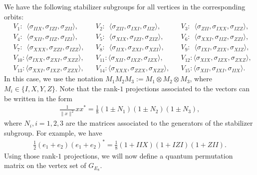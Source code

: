 We have the following stabilizer subgroups for all vertices in the corresponding orbits:
\begin{align} \label{Stabs}
    &V_1:\,\,\, \langle \sigma_{IIX}, \sigma_{IZI}, \sigma_{ZII}\rangle, &&V_2:\,\,\,\langle \sigma_{ZII}, \sigma_{IXI}, \sigma_{IIZ}\rangle, &&V_3:\,\,\,\langle \sigma_{ZII}, \sigma_{IXX}, \sigma_{IZZ}\rangle,\\
    &V_4:\,\,\,\langle \sigma_{XII}, \sigma_{IIZ}, \sigma_{IZI}\rangle, &&V_5:\,\,\,\langle \sigma_{XIX}, \sigma_{IZI}, \sigma_{ZIZ}\rangle, &&V_6:\,\,\,\langle \sigma_{XXI}, \sigma_{IIZ}, \sigma_{ZZI}\rangle,\nonumber\\
    &V_7:\,\,\,\langle \sigma_{XXX}, \sigma_{ZZI}, \sigma_{IZZ}\rangle, &&V_8:\,\,\,\langle \sigma_{IIX}, \sigma_{ZXI}, \sigma_{XZI}\rangle, &&V_9:\,\,\,\langle \sigma_{IXI}, \sigma_{ZIX}, \sigma_{XIZ}\rangle,\nonumber\\
    &V_{10}:\langle \sigma_{IXX}, \sigma_{ZXI}, \sigma_{XZZ}\rangle, &&V_{11}:\langle \sigma_{XII}, \sigma_{IXZ}, \sigma_{IZX}\rangle, &&V_{12}:\langle \sigma_{XIX}, \sigma_{IZX}, \sigma_{ZXZ}\rangle,\nonumber\\
    &V_{13}:\langle \sigma_{XXI}, \sigma_{IXZ}, \sigma_{ZZX}\rangle, &&V_{14}:\langle \sigma_{XXX}, \sigma_{ZZX}, \sigma_{XZZ}\rangle, &&V_{15}:\langle \sigma_{XII}, \sigma_{IXI}, \sigma_{IIX}\rangle.\nonumber
\end{align}
In this case, we use the notation $M_1M_2M_3:=M_1 \otimes M_2 \otimes M_3$, where $M_i\in \{I,X,Y,Z\}$.
Note that the rank-$1$ projections associated to the vectors can be written in the form 
\begin{align*}
    \frac{1}{\|x\|^2}xx^*=\frac{1}{8}(1\pm N_1)(1\pm N_2)(1\pm N_3),
\end{align*}
where $N_i, i=1,2,3$ are the matrices associated to the generators of the stabilizer subgroup. For example, we have
\begin{align*}
    \frac{1}{2}(e_1+e_2)(e_1+e_2)^*=\frac{1}{8}(1+IIX)(1+IZI)(1+ZII).
\end{align*}
Using those rank-$1$ projections, we will now define a quantum permutation matrix on the vertex set of $G_{E_8}$. 

